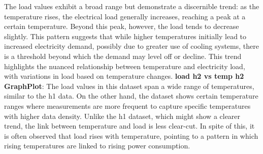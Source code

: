 \documentclass[12pt, a4paper,twoside]{report}
\theoremstyle{plain} %
\theoremstyle{definition} %
\theoremstyle{remark} %
\numberwithin{equation}{chapter}
\begin{document}
The load values exhibit a broad range but demonstrate a discernible trend: as the temperature rises, the electrical load generally increases, reaching a peak at a certain temperature. Beyond this peak, however, the load tends to decrease slightly. This pattern suggests that while higher temperatures initially lead to increased electricity demand, possibly due to greater use of cooling systems, there is a threshold beyond which the demand may level off or decline. This trend highlights the nuanced relationship between temperature and electricity load, with variations in load based on temperature changes.
\newline
\textbf{load h2 vs temp h2 GraphPlot}: The load values in this dataset span a wide range of temperatures, similar to the h1 data. On the other hand, the dataset shows certain temperature ranges where measurements are more frequent to capture specific temperatures with higher data density. Unlike the h1 dataset, which might show a clearer trend, the link between temperature and load is less clear-cut. In spite of this, it is often observed that load rises with temperature, pointing to a pattern in which rising temperatures are linked to rising power consumption.
\end{document}
